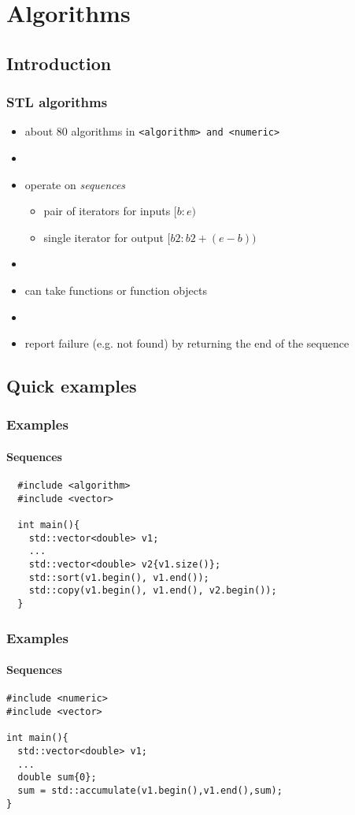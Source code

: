\section{Algorithms}
\subsection{Introduction}
\begin{frame}
  \frametitle{STL algorithms}
  \begin{itemize}
  \item about 80 algorithms in \texttt{<algorithm> and <numeric>}
  \item[]
  \item operate on \emph{sequences}
    \begin{itemize}
    \item pair of iterators for inputs $[b:e)$
    \item single iterator for output $[b2: b2+(e-b))$
    \end{itemize}
  \item[]
  \item can take functions or function objects
  \item[]
  \item report failure (e.g. not found) by returning the end of the sequence
  \end{itemize}
\end{frame}
\subsection{Quick examples}
\begin{frame}[fragile]
  \frametitle{Examples}
  \framesubtitle{Sequences}
\begin{lstlisting}
  #include <algorithm>
  #include <vector>
  
  int main(){
    std::vector<double> v1;
    ...
    std::vector<double> v2{v1.size()};
    std::sort(v1.begin(), v1.end());
    std::copy(v1.begin(), v1.end(), v2.begin());
  }
\end{lstlisting}
\end{frame}

\begin{frame}[fragile]
  \frametitle{Examples}
  \framesubtitle{Sequences}
\begin{lstlisting}
#include <numeric>
#include <vector>
  
int main(){
  std::vector<double> v1;
  ...
  double sum{0};
  sum = std::accumulate(v1.begin(),v1.end(),sum);
}
\end{lstlisting}
\end{frame}


